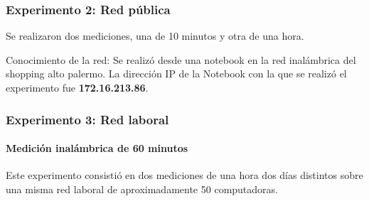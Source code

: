 \subsubsection{Experimento 2: Red pública}
Se realizaron dos mediciones, una de 10 minutos y otra de una hora.

Conocimiento de la red:
Se realizó desde una notebook en la red inalámbrica del shopping alto palermo.
La dirección IP de la Notebook con la que se realizó el experimento fue \textbf{172.16.213.86}.



\subsubsection{Experimento 3: Red laboral}
\paragraph{Medición inalámbrica de 60 minutos}

Este experimento consistió en dos mediciones de una hora dos días distintos sobre una misma red laboral de aproximadamente 50 computadoras.

